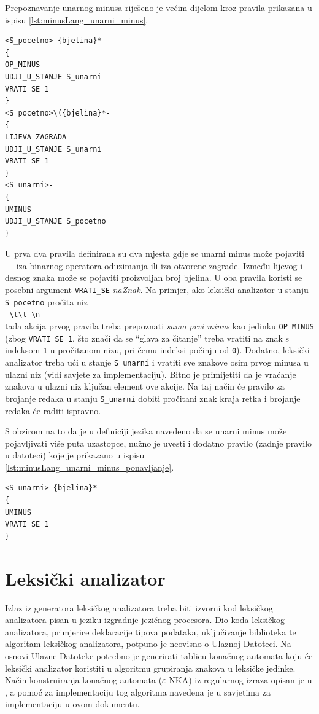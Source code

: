 \documentclass[times, 12pt, utf8]{book}
\begin{document}
Prepoznavanje unarnog minusa riješeno je većim dijelom kroz pravila prikazana u ispisu \ref{lst:minusLang_unarni_minus}.

\begin{lstlisting}[caption={Pravila za detekciju unarnog minusa.},label=lst:minusLang_unarni_minus]
<S_pocetno>-{bjelina}*-
{
OP_MINUS
UDJI_U_STANJE S_unarni
VRATI_SE 1
}
<S_pocetno>\({bjelina}*-
{
LIJEVA_ZAGRADA
UDJI_U_STANJE S_unarni
VRATI_SE 1
}
<S_unarni>-
{
UMINUS
UDJI_U_STANJE S_pocetno
}
\end{lstlisting}

U prva dva pravila definirana su dva mjesta gdje se unarni minus može pojaviti --- iza binarnog operatora oduzimanja ili iza otvorene zagrade.
Između lijevog i desnog znaka može se pojaviti proizvoljan broj bjelina.
U oba pravila koristi se posebni argument \verb|VRATI_SE| \emph{naZnak}.
Na primjer, ako leksički analizator u stanju \verb|S_pocetno| pročita niz\\
\verb|-\t\t \n -|\\
tada akcija prvog pravila treba prepoznati \emph{samo prvi minus} kao jedinku \verb|OP_MINUS| (zbog \verb|VRATI_SE 1|, što znači da se ``glava za čitanje'' treba vratiti na znak s indeksom \verb|1| u pročitanom nizu, pri čemu indeksi počinju od \verb|0|).
Dodatno, leksički analizator treba ući u stanje \verb|S_unarni| i vratiti sve znakove osim prvog minusa u ulazni niz (vidi savjete za implementaciju).
Bitno je primijetiti da je vraćanje znakova u ulazni niz ključan element ove akcije.
Na taj način će pravilo za brojanje redaka u stanju \verb|S_unarni| dobiti pročitani znak kraja retka i brojanje redaka će raditi ispravno.

S obzirom na to da je u definiciji jezika navedeno da se unarni minus može pojavljivati više puta uzastopce, nužno je uvesti i dodatno pravilo (zadnje pravilo u datoteci) koje je prikazano u ispisu \ref{lst:minusLang_unarni_minus_ponavljanje}.

\begin{lstlisting}[caption={Pravila za detekciju ponavljanja unarnog minusa.},label=lst:minusLang_unarni_minus_ponavljanje]
<S_unarni>-{bjelina}*-
{
UMINUS
VRATI_SE 1
}
\end{lstlisting}

\section{Leksički analizator}\label{sec:leksicki_analizator}
Izlaz iz generatora leksičkog analizatora treba biti izvorni kod leksičkog analizatora pisan u jeziku izgradnje jezičnog procesora.
Dio koda leksičkog analizatora, primjerice deklaracije tipova podataka, uključivanje biblioteka te algoritam leksičkog analizatora, potpuno je neovisno o Ulaznoj Datoteci.
Na osnovi Ulazne Datoteke potrebno je generirati tablicu konačnog automata koju će leksički analizator koristiti u algoritmu grupiranja znakova u leksičke jedinke.
Način konstruiranja konačnog automata (\(\varepsilon\)-NKA) iz regularnog izraza opisan je u \cite[poglavlje 2.2.2]{utr}, a pomoć za implementaciju tog algoritma navedena je u savjetima za implementaciju u ovom dokumentu.
\end{document}
